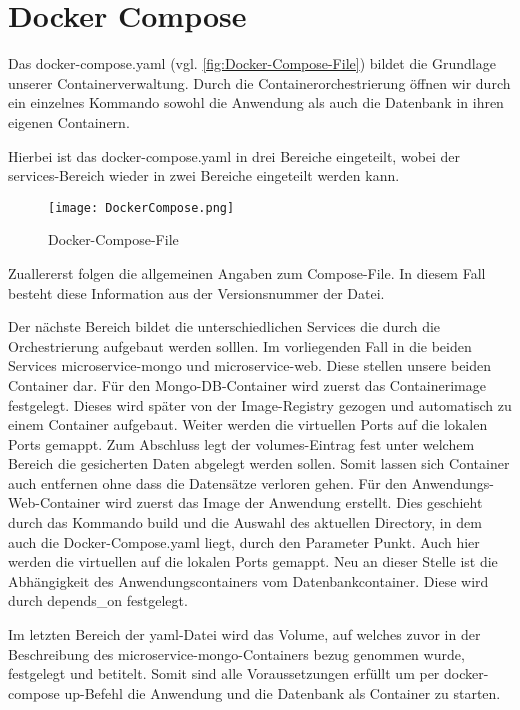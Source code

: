 
\chapter{Docker Compose}
\label{ch:Docker Compose}
Das docker-compose.yaml (vgl. \autoref{fig:Docker-Compose-File}) bildet die Grundlage unserer Containerverwaltung. Durch die Containerorchestrierung öffnen wir durch ein einzelnes Kommando sowohl die Anwendung als auch die Datenbank in ihren eigenen Containern.

Hierbei ist das \glqq docker-compose.yaml\grqq{} in drei Bereiche eingeteilt, wobei der services-Bereich wieder in zwei Bereiche eingeteilt werden kann.

\begin{wrapfigure}{r}{0\textwidth}
\centering
\texttt{[image: DockerCompose.png]}
\vspace{3pt}
\caption{Docker-Compose-File}
\label{fig:Docker-Compose-File}
\end{wrapfigure}


Zuallererst folgen die allgemeinen Angaben zum Compose-File. In diesem Fall besteht diese Information aus der Versionsnummer der Datei.

Der nächste Bereich bildet die unterschiedlichen Services die durch die Orchestrierung aufgebaut werden solllen. Im vorliegenden Fall in die beiden Services \glqq  microservice-mongo\grqq{} und \glqq  microservice-web\grqq{}. Diese stellen unsere beiden Container dar. 
Für den Mongo-DB-Container wird zuerst das Containerimage festgelegt. Dieses wird später von der Image-Registry gezogen und automatisch zu einem Container aufgebaut. Weiter werden die virtuellen Ports auf die lokalen Ports gemappt. Zum Abschluss legt der \glqq  volumes\grqq{}-Eintrag fest unter welchem Bereich die gesicherten Daten abgelegt werden sollen. Somit lassen sich Container auch entfernen ohne dass die Datensätze verloren gehen.
Für den Anwendungs-Web-Container wird zuerst das Image der Anwendung erstellt. Dies geschieht durch das Kommando \glqq  build\grqq{} und die Auswahl des aktuellen Directory, in dem auch die Docker-Compose.yaml liegt, durch den Parameter \glqq  Punkt\grqq{}. Auch hier werden die virtuellen auf die lokalen Ports gemappt. Neu an dieser Stelle ist die Abhängigkeit des Anwendungscontainers vom Datenbankcontainer. Diese wird durch \glqq  depends\_on\grqq{} festgelegt.

Im letzten Bereich der yaml-Datei wird das Volume, auf welches zuvor in der Beschreibung des \glqq  microservice-mongo\grqq{}-Containers bezug genommen wurde, festgelegt und betitelt.
Somit sind alle Voraussetzungen erfüllt um per \glqq  docker-compose up\grqq -Befehl die Anwendung und die Datenbank als Container zu starten.
